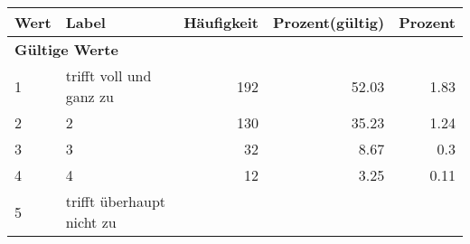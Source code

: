      \begin{longtable}{lXrrr}
     \toprule
     \textbf{Wert} & \textbf{Label} & \textbf{Häufigkeit} & \textbf{Prozent(gültig)} & \textbf{Prozent} \\
     \endhead
     \midrule
     \multicolumn{5}{l}{\textbf{Gültige Werte}}\\

     1 &
     \multicolumn{1}{X}{ trifft voll und ganz zu   } &


       \num{192} &
       \num[round-mode=places,round-precision=2]{52.03} &
         \num[round-mode=places,round-precision=2]{1.83} \\

     2 &
     \multicolumn{1}{X}{ 2   } &


       \num{130} &
       \num[round-mode=places,round-precision=2]{35.23} &
         \num[round-mode=places,round-precision=2]{1.24} \\

     3 &
     \multicolumn{1}{X}{ 3   } &


       \num{32} &
       \num[round-mode=places,round-precision=2]{8.67} &
         \num[round-mode=places,round-precision=2]{0.3} \\

     4 &
     \multicolumn{1}{X}{ 4   } &


       \num{12} &
       \num[round-mode=places,round-precision=2]{3.25} &
         \num[round-mode=places,round-precision=2]{0.11} \\

     5 &
     \multicolumn{1}{X}{ trifft überhaupt nicht zu   } &



\end{longtable}
